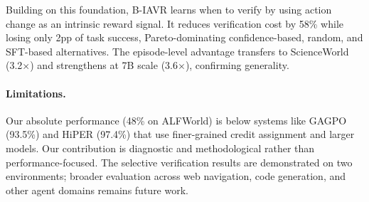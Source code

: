 \documentclass[10pt]{article}
\newcommand{\ours}{B-IAVR}
\begin{document}
Building on this foundation, \ours{} learns when to verify by using action change as an intrinsic reward signal. It reduces verification cost by 58\% while losing only 2pp of task success, Pareto-dominating confidence-based, random, and SFT-based alternatives. The episode-level advantage transfers to ScienceWorld (3.2$\times$) and strengthens at 7B scale (3.6$\times$), confirming generality.

\paragraph{Limitations.}
Our absolute performance (48\% on ALFWorld) is below systems like GAGPO (93.5\%) and HiPER (97.4\%) that use finer-grained credit assignment and larger models. Our contribution is diagnostic and methodological rather than performance-focused. The selective verification results are demonstrated on two environments; broader evaluation across web navigation, code generation, and other agent domains remains future work.
\end{document}
